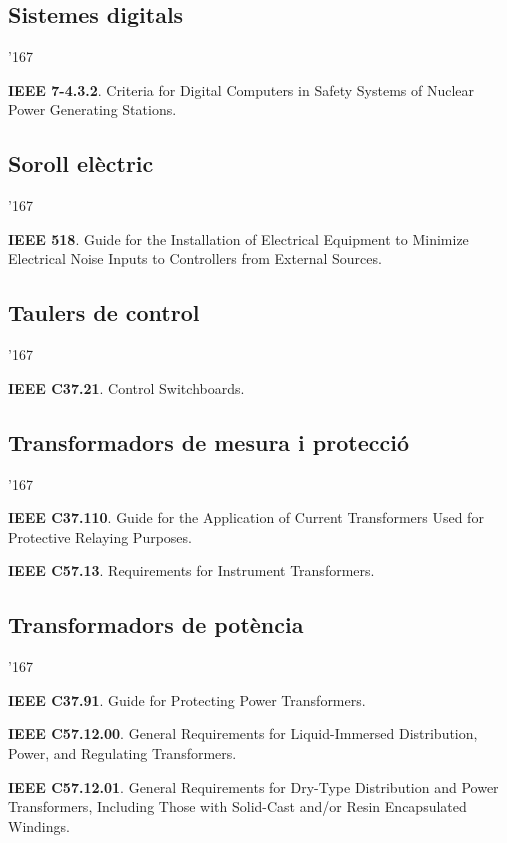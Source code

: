 \subsection*{Sistemes digitals}
\begin{dinglist}{'167}
    \item \textbf{IEEE 7-4.3.2}. Criteria for Digital Computers in Safety Systems of Nuclear Power Generating Stations.
\end{dinglist}


\subsection*{Soroll el\`{e}ctric}
\begin{dinglist}{'167}
    \item \textbf{IEEE 518}. Guide for the Installation of Electrical Equipment to Minimize Electrical Noise Inputs to Controllers from External Sources.
\end{dinglist}

\subsection*{Taulers de control}
\begin{dinglist}{'167}
    \item \textbf{IEEE C37.21}. Control Switchboards.
\end{dinglist}


\subsection*{Transformadors de mesura i protecci\'{o}}
\begin{dinglist}{'167}
    \item \textbf{IEEE C37.110}. Guide for the Application of Current Transformers Used for Protective Relaying Purposes.
    \item \textbf{IEEE C57.13}. Requirements for Instrument Transformers.
\end{dinglist}


\subsection*{Transformadors de pot\`{e}ncia}
\begin{dinglist}{'167}
    \item \textbf{IEEE C37.91}. Guide for Protecting Power Transformers.
    \item \textbf{IEEE C57.12.00}. General Requirements for Liquid-Immersed Distribution, Power, and Regulating Transformers.
    \item \textbf{IEEE C57.12.01}. General Requirements for Dry-Type Distribution and Power Transformers, Including Those with Solid-Cast and/or Resin Encapsulated Windings.
\end{dinglist}



